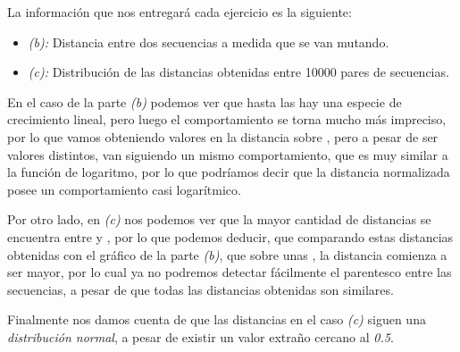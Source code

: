 \begin{enumerate}
		La información que nos entregará cada ejercicio es la siguiente:
		\begin{itemize}
			\item \emph{(b):} Distancia entre dos secuencias a medida que se van mutando.
			\item \emph{(c):} Distribución de las distancias obtenidas entre 10000 pares de
				secuencias.
		\end{itemize}

		En el caso de la parte \emph{(b)} podemos ver que hasta las 
		hay una especie de crecimiento lineal, pero luego el comportamiento se torna
		mucho más impreciso, por lo que vamos obteniendo valores en la distancia
		sobre , pero a pesar de ser valores distintos, van siguiendo un mismo
		comportamiento, que es muy similar a la función de logaritmo, por lo que podríamos
		decir que la distancia normalizada posee un comportamiento casi logarítmico.

		Por otro lado, en \emph{(c)} nos podemos ver que la mayor cantidad de distancias
		se encuentra entre  y , por lo que podemos deducir, que
		comparando estas distancias obtenidas con el gráfico de la parte \emph{(b)},
		que sobre unas , la distancia comienza a ser mayor,
		por lo cual ya no podremos detectar fácilmente el parentesco entre las secuencias,
		a pesar de que todas las distancias obtenidas son similares.

		Finalmente nos damos cuenta de que las distancias en el caso \emph{(c)} siguen
		una \emph{distribución normal}, a pesar de existir un valor extraño cercano al \emph{0.5}.


\end{enumerate}
